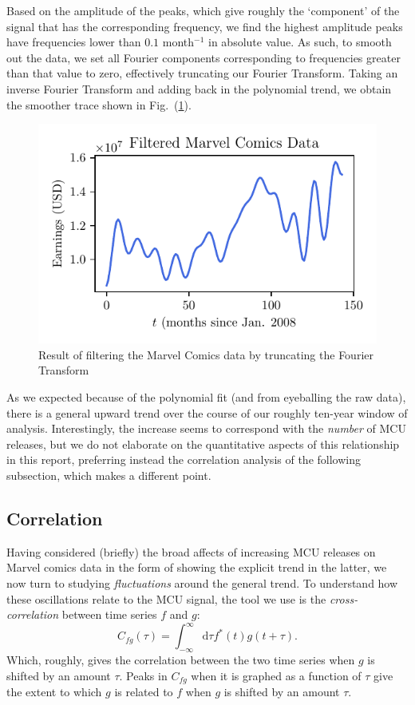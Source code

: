 \documentclass[12pt]{article}
\renewcommand{\d}{\mathrm d}
\begin{document}
Based on the amplitude of the peaks, which give roughly the `component' of the signal that has the corresponding frequency, we find the highest amplitude peaks have frequencies lower than $0.1$ month$^{-1}$ in absolute value.  As such, to smooth out the data, we set all Fourier components corresponding to frequencies greater than that value to zero, effectively truncating our Fourier Transform.  Taking an inverse Fourier Transform and adding back in the polynomial trend, we obtain the smoother trace shown in Fig.~(\ref{fig:filtered}).
\begin{figure}[h]
    \centering
    \includegraphics{figures/filtered.pdf}
    \caption{Result of filtering the Marvel Comics data by truncating the Fourier Transform}\label{fig:filtered}
\end{figure}
As we expected because of the polynomial fit (and from eyeballing the raw data), there is a general upward trend over the course of our roughly ten-year window of analysis.  Interestingly, the increase seems to correspond with the \textit{number} of MCU releases, but we do not elaborate on the quantitative aspects of this relationship in this report, preferring instead the correlation analysis of the following subsection, which makes a different point.


\subsection{Correlation}
\label{sec:correlation}
Having considered (briefly) the broad affects of increasing MCU releases on Marvel comics data in the form of showing the explicit trend in the latter, we now turn to studying \textit{fluctuations} around the general trend. To understand how these oscillations relate to the MCU signal, the tool we use is the \textit{cross-correlation} between time series $f$ and $g$:
\begin{equation}
    C_{fg}(\tau) = \int_{-\infty}^\infty \d \tau f^*(t)g(t+\tau).
\end{equation}
Which, roughly, gives the correlation between the two time series when $g$ is shifted by an amount $\tau$.  Peaks in $C_{fg}$ when it is graphed as a function of $\tau$ give the extent to which $g$ is related to $f$ when $g$ is shifted by an amount $\tau$.
\end{document}
